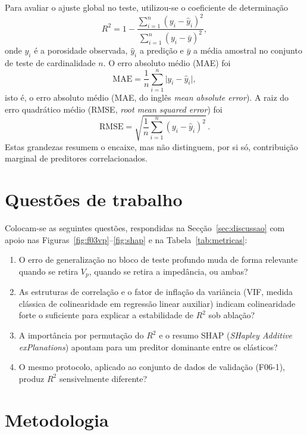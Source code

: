 \documentclass[12pt,a4paper]{article}
\newcommand{\dadosval}{conjunto de dados de validação (F06-1)}
\begin{document}
Para avaliar o ajuste global no teste, utilizou-se o coeficiente de determinação
\begin{equation}\label{eq:r2}
R^2 = 1 - \frac{\sum_{i=1}^{n}(y_i - \hat{y}_i)^2}{\sum_{i=1}^{n}(y_i - \bar{y})^2},
\end{equation}
onde \(y_i\) é a porosidade observada, \(\hat{y}_i\) a predição e \(\bar{y}\)
a média amostral no conjunto de teste de cardinalidade \(n\). O erro absoluto
médio (MAE) foi
\begin{equation}\label{eq:mae}
\mathrm{MAE} = \frac{1}{n}\sum_{i=1}^{n} \lvert y_i - \hat{y}_i\rvert ,
\end{equation}
isto é, o erro absoluto médio (MAE, do inglês \textit{mean absolute error}). A
raiz do erro quadrático médio (RMSE, \textit{root mean squared error}) foi
\begin{equation}\label{eq:rmse}
\mathrm{RMSE} = \sqrt{\frac{1}{n}\sum_{i=1}^{n}(y_i - \hat{y}_i)^2}\,.
\end{equation}
Estas grandezas resumem o encaixe, mas não distinguem, por si só, contribuição
marginal de preditores correlacionados.

\section{Questões de trabalho}\label{sec:perguntas}

Colocam-se as seguintes questões, respondidas na Secção~\ref{sec:discussao}
com apoio nas Figuras~\ref{fig:f03vp}--\ref{fig:shap} e na Tabela~\ref{tab:metricas}:

\begin{enumerate}
  \item O erro de generalização no bloco de teste profundo muda de forma
  relevante quando se retira \(V_p\), quando se retira a impedância, ou ambas?
  \item As estruturas de correlação e o fator de inflação da variância
  (VIF, medida clássica de colinearidade em regressão linear auxiliar) indicam
  colinearidade forte o suficiente para explicar a estabilidade de \(R^2\) sob
  ablação?
  \item A importância por permutação do \(R^2\) e o resumo SHAP
  (\textit{SHapley Additive exPlanations}) apontam para um preditor dominante entre os
  elásticos?
  \item O mesmo protocolo, aplicado ao \dadosval, produz \(R^2\)
  sensivelmente diferente?
\end{enumerate}

\section{Metodologia}\label{sec:metodo}
\end{document}
